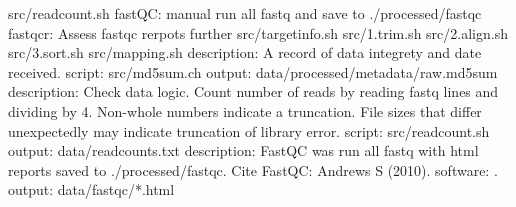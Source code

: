src/read\markdownRendererUnderscore{}count.sh\markdownRendererOlItemEnd 
{}fastQC: manual run all fastq and save to ./processed/fastqc\markdownRendererOlItemEnd 
{}fastqcr: Assess fastqc rerpots further\markdownRendererOlItemEnd 
{}src/target\markdownRendererUnderscore{}info.sh\markdownRendererOlItemEnd 
{}src/1.trim.sh\markdownRendererOlItemEnd 
{}src/2.align.sh\markdownRendererOlItemEnd 
{}src/3.sort.sh\markdownRendererOlItemEnd 
{}src/mapping.sh\markdownRendererOlItemEnd 
\markdownRendererOlEndTight \markdownRendererInterblockSeparator
{}\markdownRendererInterblockSeparator
{}\markdownRendererUlBeginTight
\markdownRendererUlItem description: A record of data integrety and date received.\markdownRendererUlItemEnd 
\markdownRendererUlItem script: src/md5sum.ch\markdownRendererUlItemEnd 
\markdownRendererUlItem output: data/processed/metadata/raw.md5sum\markdownRendererUlItemEnd 
\markdownRendererUlEndTight \markdownRendererInterblockSeparator
{}\markdownRendererInterblockSeparator
{}\markdownRendererUlBeginTight
\markdownRendererUlItem description: Check data logic. Count number of reads by reading fastq lines and dividing by 4. Non-whole numbers indicate a truncation. File sizes that differ unexpectedly may indicate truncation of library error.\markdownRendererUlItemEnd 
\markdownRendererUlItem script: src/read\markdownRendererUnderscore{}count.sh\markdownRendererUlItemEnd 
\markdownRendererUlItem output: data/readcounts.txt\markdownRendererUlItemEnd 
\markdownRendererUlEndTight \markdownRendererInterblockSeparator
{}\markdownRendererInterblockSeparator
{}\markdownRendererUlBeginTight
\markdownRendererUlItem description: FastQC was run all fastq with html reports saved to ./processed/fastqc. Cite FastQC: Andrews S (2010).\markdownRendererUlItemEnd 
\markdownRendererUlItem software: .\markdownRendererUlItemEnd 
\markdownRendererUlItem output: data/fastqc/*.html \markdownRendererUlItemEnd 
\markdownRendererUlEndTight \markdownRendererInterblockSeparator
